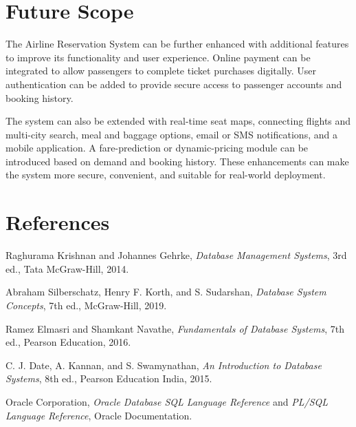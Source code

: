 \documentclass[12pt,a4paper]{article}
\begin{document}
\section{Future Scope}
The Airline Reservation System can be further enhanced with additional features to improve its
functionality and user experience. Online payment can be integrated to allow passengers to complete ticket
purchases digitally. User authentication can be added to provide secure access to passenger accounts and
booking history.

The system can also be extended with real-time seat maps, connecting flights and multi-city search, meal and
baggage options, email or SMS notifications, and a mobile application. A fare-prediction or dynamic-pricing
module can be introduced based on demand and booking history. These enhancements can make the system more
secure, convenient, and suitable for real-world deployment.

\section{References}
\begin{enumerate}[label={[\arabic*]},leftmargin=*,itemsep=0.4em]
  \item Raghurama Krishnan and Johannes Gehrke, \emph{Database Management Systems}, 3rd ed., Tata McGraw-Hill, 2014.
  \item Abraham Silberschatz, Henry F. Korth, and S. Sudarshan, \emph{Database System Concepts}, 7th ed., McGraw-Hill, 2019.
  \item Ramez Elmasri and Shamkant Navathe, \emph{Fundamentals of Database Systems}, 7th ed., Pearson Education, 2016.
  \item C. J. Date, A. Kannan, and S. Swamynathan, \emph{An Introduction to Database Systems}, 8th ed., Pearson Education India, 2015.
  \item Oracle Corporation, \emph{Oracle Database SQL Language Reference} and \emph{PL/SQL Language Reference}, Oracle Documentation.
\end{enumerate}
\end{document}
